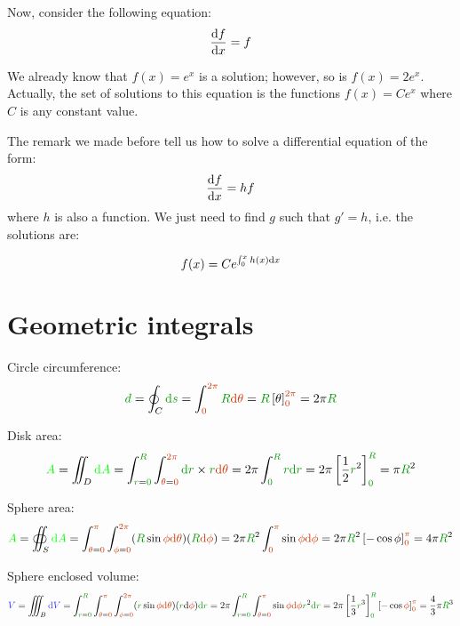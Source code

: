 Now, consider the following equation:
\[
\frac {\mathrm{d} f} {\mathrm{d} x} = f
\]

We already know that $f(x) = e^x$ is a solution; however, so is $f(x) =
2 e^x$. Actually, the set of solutions to this equation is the functions
$f(x) = C e^x$ where $C$ is any constant value.

The remark we made before tell us how to solve a differential equation
of the form:
\[
\frac {\mathrm{d} f} {\mathrm{d} x} = h f
\]
where $h$ is also a function. We just need to find $g$ such that $g' =
h$, i.e. the solutions are:

\[
f(x) = C e^{\int_0^x h(x) \mathrm{d} x}
\]


\section{Geometric integrals}

Circle circumference:
\[
\dist{d}
= \oint_C \dist{\d s}
= \int_{\angle{0}}^{\angle{2\pi}} \dist{R} \angle{\d \theta}
= \dist{R} \left[ \theta \right]_{\angle{0}}^{\angle{2\pi}}
= 2\pi \dist{R}
\]

Disk area:
\[
\area{A}
= \iint_D \area{\d A}
= \int_{\dist{r}=\dist{0}}^{\dist{R}}
  \int_{\angle{\theta}=\angle{0}}^{\angle{2\pi}}
  \dist{\d r} \times \dist{r} \angle{\d \theta}
= 2\pi \int_{\dist{0}}^{\dist{R}} \dist{r} \dist{\d r}
= 2\pi \left[\frac 1 2 \dist{r}^2\right]_{\dist{0}}^{\dist{R}}
= \pi \dist{R}^2
\]

Sphere area:
\[
\area{A}
= \oiint_S \area{\d A}
= \int_{\angle{\theta}=\angle{0}}^{\angle{\pi}}
  \int_{\angle{\phi}=\angle{0}}^{\angle{2\pi}}
  (\dist{R} \sin \angle{\phi} \angle{\d \theta})
  (\dist{R} \angle{\d \phi})
= 2\pi \dist{R}^2 \int_{\angle{0}}^{\angle{\pi}} \sin \angle{\phi} \angle{\d \phi}
= 2\pi \dist{R}^2 \left[ - \cos \phi \right]_{\angle{0}}^{\angle{\pi}}
= 4\pi \dist{R}^2
\]

Sphere enclosed volume:
\[
\vol{V}
= \iiint_B \vol{\d V}
= \int_{\dist{r}=\dist{0}}^{\dist{R}}
  \int_{\angle{\theta}=\angle{0}}^{\angle{\pi}}
  \int_{\angle{\phi}=\angle{0}}^{\angle{2\pi}}
  (\dist{r} \sin \angle{\phi} \angle{\d \theta}) (\dist{r} \d \angle{\phi}) \dist{\d r}
= 2 \pi
  \int_{\dist{r}=\dist{0}}^{\dist{R}}
  \int_{\angle{\theta}=\angle{0}}^{\angle{\pi}} \sin \angle{\phi} \angle{\d \phi} \dist{r}^2 \dist{\d r}
= 2 \pi
  \left[\frac 1 3 \dist{r}^3\right]_{\dist{0}}^{\dist{R}}
  \left[- \cos \angle{\phi}\right]_{\angle{0}}^{\angle{\pi}}
= \frac 4 3 \pi \dist{R}^3
\]
